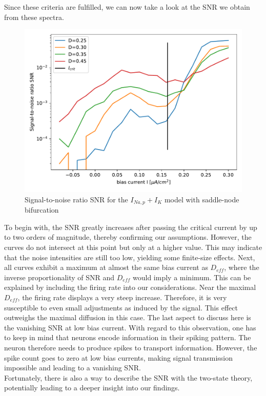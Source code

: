 \documentclass[12pt,a4paper]{article}
\begin{document}
Since these criteria are fulfilled, we can now take a look at the SNR we obtain from these spectra.
\begin{figure}[H]
	\centering
	\includegraphics[scale=1]{snrealonly2crit3.pdf}\caption{Signal-to-noise ratio SNR for the $I_{Na,p}+I_K$ model with saddle-node bifurcation}
	\label{specneur}
\end{figure}
To begin with, the SNR greatly increases after passing the critical current by up to two orders of magnitude, thereby confirming our assumptions. However, the curves do not intersect at this point but only at a higher value. This may indicate that the noise intensities are still too low, yielding some finite-size effects. Next, all curves exhibit a maximum at almost the same bias current as $D_{eff}$, where the inverse proportionality of SNR and $D_{eff}$ would imply a minimum. This can be explained by including the firing rate into our considerations. Near the maximal $D_{eff}$, the firing rate displays a very steep increase. Therefore, it is very susceptible to even small adjustments as induced by the signal. This effect outweighs the maximal diffusion in this case. The last aspect to discuss here is the vanishing SNR at low bias current. With regard to this observation, one has to keep in mind that neurons encode information in their spiking pattern. The neuron therefore needs to produce spikes to transport information. However, the spike count goes to zero at low bias currents, making signal transmission impossible and leading to a vanishing SNR.
\\
Fortunately, there is also a way to describe the SNR with the two-state theory, potentially leading to a deeper insight into our findings.
\end{document}
